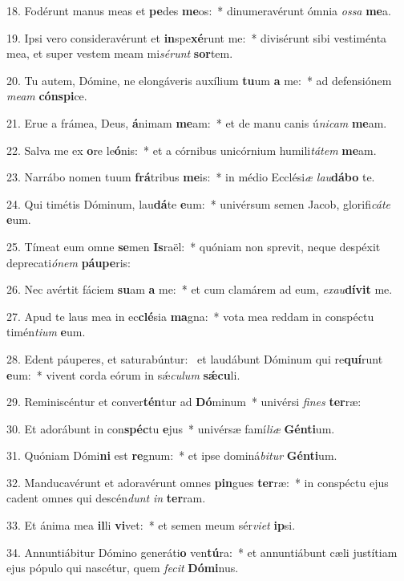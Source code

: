 18. Fodérunt manus meas et \textbf{pe}des \textbf{me}os:~*  dinumeravérunt ómnia \textit{os}\textit{sa} \textbf{me}a.\

19. Ipsi vero consideravérunt et \textbf{in}spe\textbf{xé}runt me:~*  divisérunt sibi vestiménta mea, et super vestem meam mi\textit{sé}\textit{runt} \textbf{sor}tem.\

20. Tu autem, Dómine, ne elongáveris auxílium \textbf{tu}um \textbf{a} me:~*  ad defensiónem \textit{me}\textit{am} \textbf{cón}\textbf{spi}ce.\

21. Erue a frámea, Deus, \textbf{á}nimam \textbf{me}am:~*  et de manu canis ú\textit{ni}\textit{cam} \textbf{me}am.\

22. Salva me ex \textbf{o}re le\textbf{ó}nis:~*  et a córnibus unicórnium humili\textit{tá}\textit{tem} \textbf{me}am.\

23. Narrábo nomen tuum \textbf{frá}tribus \textbf{me}is:~*  in médio Ecclési\textit{æ} \textit{lau}\textbf{dá}\textbf{bo} te.\

24. Qui timétis Dóminum, lau\textbf{dá}te \textbf{e}um:~*  univérsum semen Jacob, glorifi\textit{cá}\textit{te} \textbf{e}um.\

25. Tímeat eum omne \textbf{se}men \textbf{Is}raël:~*  quóniam non sprevit, neque despéxit deprecati\textit{ó}\textit{nem} \textbf{páu}\textbf{pe}ris:\

26. Nec avértit fáciem \textbf{su}am \textbf{a} me:~*  et cum clamárem ad eum, \textit{ex}\textit{au}\textbf{dí}\textbf{vit} me.\

27. Apud te laus mea in ec\textbf{clé}sia \textbf{ma}gna:~*  vota mea reddam in conspéctu timén\textit{ti}\textit{um} \textbf{e}um.\

28. Edent páuperes, et saturabúntur: \dag\  et laudábunt Dóminum qui re\textbf{quí}runt \textbf{e}um:~*  vivent corda eórum in sǽ\textit{cu}\textit{lum} \textbf{sǽ}\textbf{cu}li.\

29. Reminiscéntur et conver\textbf{tén}tur ad \textbf{Dó}minum~*  univérsi \textit{fi}\textit{nes} \textbf{ter}ræ:\

30. Et adorábunt in con\textbf{spéc}tu \textbf{e}jus~*  univérsæ famí\textit{li}\textit{æ} \textbf{Gén}\textbf{ti}um.\

31. Quóniam Dómi\textbf{ni} est \textbf{re}gnum:~*  et ipse dominá\textit{bi}\textit{tur} \textbf{Gén}\textbf{ti}um.\

32. Manducavérunt et adoravérunt omnes \textbf{pin}gues \textbf{ter}ræ:~*  in conspéctu ejus cadent omnes qui descén\textit{dunt} \textit{in} \textbf{ter}ram.\

33. Et ánima mea \textbf{il}li \textbf{vi}vet:~*  et semen meum sér\textit{vi}\textit{et} \textbf{ip}si.\

34. Annuntiábitur Dómino generáti\textbf{o} ven\textbf{tú}ra:~*  et annuntiábunt cæli justítiam ejus pópulo qui nascétur, quem \textit{fe}\textit{cit} \textbf{Dó}\textbf{mi}nus.\

